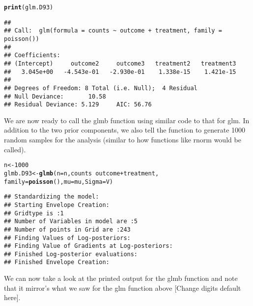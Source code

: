 \documentclass{article}\usepackage[]{graphicx}\usepackage[]{color}
\makeatletter
\newcommand{\hlnum}[1]{\textcolor[rgb]{0.686,0.059,0.569}{#1}}%
\newcommand{\hlopt}[1]{\textcolor[rgb]{0,0,0}{#1}}%
\newcommand{\hlstd}[1]{\textcolor[rgb]{0.345,0.345,0.345}{#1}}%
\newcommand{\hlkwb}[1]{\textcolor[rgb]{0.69,0.353,0.396}{#1}}%
\newcommand{\hlkwc}[1]{\textcolor[rgb]{0.333,0.667,0.333}{#1}}%
\newcommand{\hlkwd}[1]{\textcolor[rgb]{0.737,0.353,0.396}{\textbf{#1}}}%
\newenvironment{kframe}{%
 \def\at@end@of@kframe{}%
 \ifinner\ifhmode%
  \def\at@end@of@kframe{\end{minipage}}%
  \begin{minipage}{\columnwidth}%
 \fi\fi%
 \def\FrameCommand##1{\hskip\@totalleftmargin \hskip-\fboxsep
 \colorbox{shadecolor}{##1}\hskip-\fboxsep
     \hskip-\linewidth \hskip-\@totalleftmargin \hskip\columnwidth}%
 \MakeFramed {\advance\hsize-\width
   \@totalleftmargin\z@ \linewidth\hsize
   \@setminipage}}%
 {\par\unskip\endMakeFramed%
 \at@end@of@kframe}
\newenvironment{knitrout}{}{} %
\makeatother
\begin{document}
\begin{knitrout}
\color{fgcolor}\begin{kframe}
\begin{alltt}
\hlkwd{print}\hlstd{(glm.D93)}
\end{alltt}
\begin{verbatim}
## 
## Call:  glm(formula = counts ~ outcome + treatment, family = poisson())
## 
## Coefficients:
## (Intercept)     outcome2     outcome3   treatment2   treatment3  
##   3.045e+00   -4.543e-01   -2.930e-01    1.338e-15    1.421e-15  
## 
## Degrees of Freedom: 8 Total (i.e. Null);  4 Residual
## Null Deviance:	    10.58 
## Residual Deviance: 5.129 	AIC: 56.76
\end{verbatim}
\end{kframe}
\end{knitrout}


We are now ready to call the glmb function using similar code to that for glm. In addition to the two prior components, we also tell the function to generate 1000 random samples for the analysis (similar to how functions like rnorm would be called). 

\begin{knitrout}
\color{fgcolor}\begin{kframe}
\begin{alltt}
\hlstd{n}\hlkwb{<-}\hlnum{1000}
\hlstd{glmb.D93}\hlkwb{<-}\hlkwd{glmb}\hlstd{(}\hlkwc{n}\hlstd{=n,counts} \hlopt{~} \hlstd{outcome} \hlopt{+} \hlstd{treatment,}
               \hlkwc{family} \hlstd{=} \hlkwd{poisson}\hlstd{(),}\hlkwc{mu}\hlstd{=mu,}\hlkwc{Sigma}\hlstd{=V)}
\end{alltt}
\begin{verbatim}
## Standardizing the model:
## Starting Envelope Creation:
## Gridtype is :1
## Number of Variables in model are :5
## Number of points in Grid are :243
## Finding Values of Log-posteriors:
## Finding Value of Gradients at Log-posteriors:
## Finished Log-posterior evaluations:
## Finished Envelope Creation:
\end{verbatim}
\end{kframe}
\end{knitrout}

We can now take a look at the printed output for the glmb function and note that it mirror's what we saw for the glm function above [Change digits default here].
\end{document}
